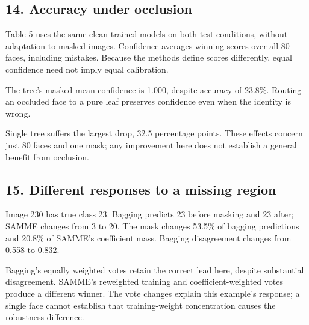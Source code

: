 \documentclass[10pt,twocolumn,letterpaper]{article}
\begin{document}
\subsection*{14. Accuracy under occlusion}
Table 5 uses the same clean-trained models on both test conditions, without adaptation to masked images. Confidence averages winning scores over all 80 faces, including mistakes. Because the methods define scores differently, equal confidence need not imply equal calibration.

The tree's masked mean confidence is 1.000, despite accuracy of 23.8\%. Routing an occluded face to a pure leaf preserves confidence even when the identity is wrong.

Single tree suffers the largest drop, 32.5 percentage points.  These effects concern just 80 faces and one mask; any improvement here does not establish a general benefit from occlusion.

\newpage
\subsection*{15. Different responses to a missing region}
Image 230 has true class 23. Bagging predicts 23 before masking and 23 after; SAMME changes from 3 to 20. The mask changes 53.5\% of bagging predictions and 20.8\% of SAMME's coefficient mass. Bagging disagreement changes from 0.558 to 0.832.

Bagging's equally weighted votes retain the correct lead here, despite substantial disagreement. SAMME's reweighted training and coefficient-weighted votes produce a different winner. The vote changes explain this example's response; a single face cannot establish that training-weight concentration causes the robustness difference.
\end{document}
